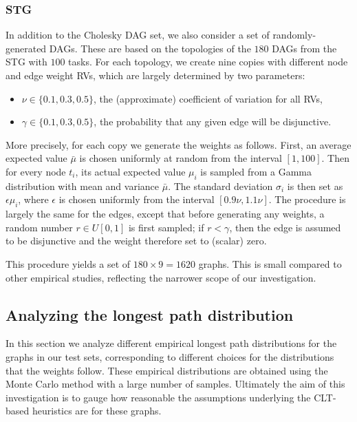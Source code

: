 \documentclass[12pt]{article}
\begin{document}
\subsubsection{STG}
\label{subsubsect.stg}

In addition to the Cholesky DAG set, we also consider a set of randomly-generated DAGs. These are based on the topologies of the $180$ DAGs from the STG with $100$ tasks. For each topology, we create nine copies with different node and edge weight RVs, which are largely determined by two parameters:
\begin{itemize}
\item $\nu \in \{ 0.1, 0.3, 0.5 \}$, the (approximate) coefficient of variation for all RVs,
  \item $\gamma \in \{ 0.1, 0.3, 0.5 \}$, the probability that any given edge will be disjunctive.
  \end{itemize}
  More precisely, for each copy we generate the weights as follows. First, an average expected value $\bar{\mu}$ is chosen uniformly at random from the interval $[1, 100]$. Then for every node $t_i$, its actual expected value $\mu_i$ is sampled from a Gamma distribution with mean and variance $\bar{\mu}$. The standard deviation $\sigma_i$ is then set as $\epsilon \mu_i$, where $\epsilon$ is chosen uniformly from the interval $[0.9\nu, 1.1\nu]$. The procedure is largely the same for the edges, except that before generating any weights, a random number $r \in U[0, 1]$ is first sampled; if $r < \gamma$, then the edge is assumed to be disjunctive and the weight therefore set to (scalar) zero.

  This procedure yields a set of $180 \times 9 = 1620$ graphs. This is small compared to other empirical studies, reflecting the narrower scope of our investigation.

\subsection{Analyzing the longest path distribution}
\label{subsect.empirical_distribution}

In this section we analyze different empirical longest path distributions for the graphs in our test sets, corresponding to different choices for the distributions that the weights follow. These empirical distributions are obtained using the Monte Carlo method with a large number of samples. Ultimately the aim of this investigation is to gauge how reasonable the assumptions underlying the CLT-based heuristics are for these graphs.   
\end{document}
